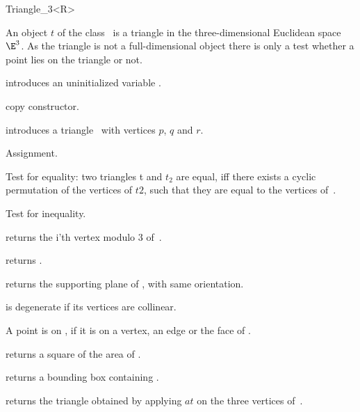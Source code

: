 \begin{ccRefClass} {Triangle_3<R>}

\ccDefinition  An object $t$ of the class \ccRefName\ is a triangle in
the three-dimensional Euclidean space $\E^3$. As the triangle is not
a full-dimensional object there is only a test whether a point lies on
the triangle or not.
 
\ccCreation
{}

\ccHidden {}
             {introduces an uninitialized variable \ccVar.}

\ccHidden {}
 	    {copy constructor.}

            {introduces a triangle \ccVar\ with vertices $p$, $q$ and $r$.}

\ccOperations

\ccHidden {}
        {Assignment.}

       {Test for equality: two triangles t and $t_2$ are equal, iff there 
        exists a cyclic permutation of the vertices of $t2$, such that 
        they are equal to the vertices of~\ccVar.}

       {Test for inequality.}

       {returns the i'th vertex modulo 3  of~\ccVar.}

       {returns .}

       {returns the supporting plane of \ccVar, with same
       orientation.}

\ccPredicates

       {{\ccVar} is degenerate if its vertices are collinear.}

       {A point is on \ccVar, if it is on a vertex, an edge or the
        face of \ccVar.}


       {returns a square of the area of \ccVar.}

       {returns a bounding box containing \ccVar.}

       {returns the triangle obtained by applying $at$ on the three
        vertices of~\ccVar.}

\ccSeeAlso
{} \\

\end{ccRefClass} 
